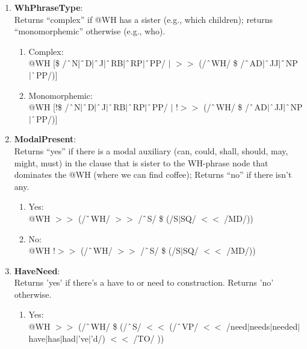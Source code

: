 \begin{enumerate}
    \item \textbf{WhPhraseType}: \\
    Returns ``complex'' if @WH has a sister (e.g., \textsf{which children}); returns ``monomorphemic'' otherwise (e.g., \textsf{who}).
        \begin{enumerate}  
            \item Complex: \\
            @WH [\$ /$\string^$N$|\string^$D$|\string^$J$|\string^$RB$|\string^$RP$|\string^$PP/
            $|$ $>\!\!>$ (/$\string^$WH/ \$ /$\string^$AD$|\string^$JJ$|\string^$NP$|\string^$PP/)]

            \item Monomorphemic: \\
            @WH [!\$ /$\string^$N$|\string^$D$|\string^$J$|\string^$RB$|\string^$RP$|\string^$PP/
            $|$ !$>\!\!>$ (/$\string^$WH/ \$ /$\string^$AD$|\string^$JJ$|\string^$NP$|\string^$PP/)]
        \end{enumerate}

    \item \textbf{ModalPresent}: \\
    Returns ``yes'' if there is a modal auxiliary (\textsf{can}, \textsf{could}, \textsf{shall}, \textsf{should}, \textsf{may}, \textsf{might}, \textsf{must}) in the clause that is sister to the WH-phrase node that dominates the @WH (\textsf{where we can find coffee}); Returns ``no'' if there isn't any. 
        \begin{enumerate}
            \item Yes: \\
            @WH $>\!\!>$ (/$\string^$WH/ $>\!\!>$ /$\string^$S/ \$ (/S$|$SQ/ $<\!\!<$ /MD/))
            \item No: \\
            @WH !$>\!\!>$ (/$\string^$WH/  $>\!\!>$ /$\string^$S/ \$ (/S$|$SQ/ $<\!\!<$ /MD/))
        \end{enumerate}
        
    \item \textbf{HaveNeed}:\\
    Returns 'yes' if there's a \textsf{have to} or \textsf{need to} construction. Returns 'no' otherwise.
        \begin{enumerate}
            \item Yes: \\
            @WH $>\!\!>$ (/$\string^$WH/ \$ (/$\string^$S/ $<\!\!<$ (/$\string^$VP/ $<\!\!<$ /need$|$needs$|$needed$|$have$|$has$|$had$|$'ve$|$'d/) $<\!\!<$ /TO/ ))


\end{enumerate}
\end{enumerate}
